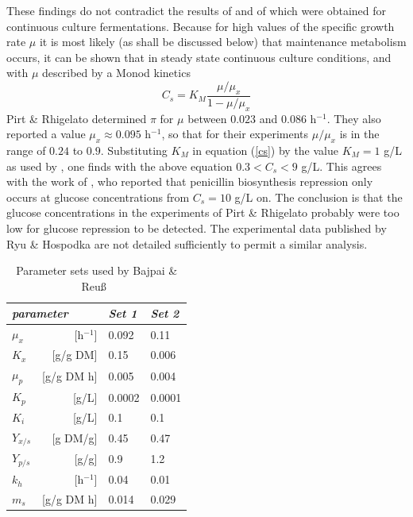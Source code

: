 \documentclass[aoas,preprint]{imsart}
\numberwithin{equation}{section}
\theoremstyle{plain}
\begin{document}
{These findings do not contradict the results of
\cite{r1}  and of \cite{r4} which were obtained for
continuous culture fermentations.
Because for high values of the specific
growth rate $\mu$ it is most likely (as shall be discussed below) that
maintenance metabolism occurs, it can be shown that
in steady state continuous culture conditions, and with $\mu$ described by a Monod kinetics
\begin{equation}
    C_{s}  =  K_{M} \frac{\mu/\mu_{x}}{1-\mu/\mu_{x}} \label{cs}
\end{equation}
Pirt \& Rhigelato determined $\pi$ for $\mu$ between
$0.023$ and $0.086$ h$^{-1}$.
They also reported a value $\mu_{x} \approx 0.095$
h$^{-1}$, so that for their experiments $\mu/\mu_{x}$ is in the range
of $0.24$ to $0.9$.
Substituting $K _M$ in equation (\ref{cs}) by
the value $K_{M}=1$ g/L as used by \cite{r1}, one finds
with the above equation $0.3 < C_{s} < 9$ g/L. This agrees with
the work of  \cite{r4}, who reported that penicillin biosynthesis
repression only occurs at glucose concentrations from $C_{s}=10$ g/L on.
The conclusion is that the glucose concentrations in the experiments of
Pirt \& Rhigelato probably were too low for glucose repression to be
detected. The experimental data published by Ryu \& Hospodka
are not detailed sufficiently to permit a similar analysis.

\begin{table}
\centering
\caption{Parameter sets used by Bajpai \& Reu\ss\ }\label{parset}
\begin{tabular}{lrll}
\hline
\multicolumn{2}{l}{\it parameter} & {\it Set 1} & {\it Set 2}\\
\hline
$\mu_{x}$           & [h$^{-1}$]  & 0.092       & 0.11          \\
$K_{x}$             & [g/g DM]     & 0.15        & 0.006         \\
$\mu_{p}$           & [g/g DM h]  & 0.005       & 0.004         \\
$K_{p}$             & [g/L]        & 0.0002      & 0.0001        \\
$K_{i}$             & [g/L]        & 0.1         & 0.1           \\
$Y_{x/s}$           & [g DM/g]     & 0.45        & 0.47          \\
$Y_{p/s}$           & [g/g]        & 0.9         & 1.2           \\
$k_{h}$             & [h$^{-1}$]  & 0.04        & 0.01          \\
$m_{s}$             & [g/g DM h]  & 0.014       & 0.029         \\
\hline
\end{tabular}
\end{table}

}
\end{document}
